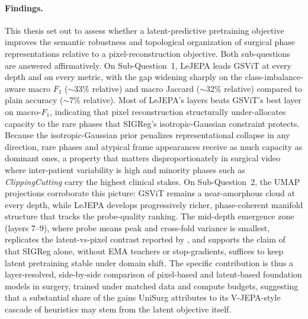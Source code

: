 \documentclass[11pt, a4paper]{article}
\begin{document}
\paragraph{Findings.} This thesis set out to assess whether a latent-predictive pretraining objective improves the semantic robustness and topological organization of surgical phase representations relative to a pixel-reconstruction objective. Both sub-questions are answered affirmatively. On Sub-Question~1, LeJEPA leads GSViT at every depth and on every metric, with the gap widening sharply on the class-imbalance-aware macro $F_1$ ($\sim$33\% relative) and macro Jaccard ($\sim$32\% relative) compared to plain accuracy ($\sim$7\% relative). Most of LeJEPA's layers beats GSViT's best layer on macro-$F_1$, indicating that pixel reconstruction structurally under-allocates capacity to the rare phases that SIGReg's isotropic-Gaussian constraint protects. Because the isotropic-Gaussian 
prior penalizes representational collapse in any direction, rare phases  and atypical frame appearances receive as much capacity as dominant ones, a property that matters disproportionately in surgical video where inter-patient variability is high and minority phases such as \emph{ClippingCutting} carry the highest clinical stakes. On Sub-Question~2, the UMAP projections corroborate this picture: GSViT remains a near-amorphous cloud at every depth, while LeJEPA develops progressively richer, phase-coherent manifold structure that tracks the probe-quality ranking. The mid-depth emergence zone (layers 7--9), where probe means peak and cross-fold variance is smallest, replicates the latent-vs-pixel contrast reported by \textcite{joseph-2026}, and supports the claim of \textcite{balestriero-2025} that SIGReg alone, without EMA teachers or stop-gradients, suffices to keep latent pretraining stable under domain shift. The specific contribution is thus a layer-resolved, side-by-side comparison of pixel-based and latent-based foundation models in surgery, trained under matched data and compute budgets, suggesting that a substantial share of the gains UniSurg \parencite{wu-2026} attributes to its V-JEPA-style cascade of heuristics may stem from the latent objective itself.
\end{document}
